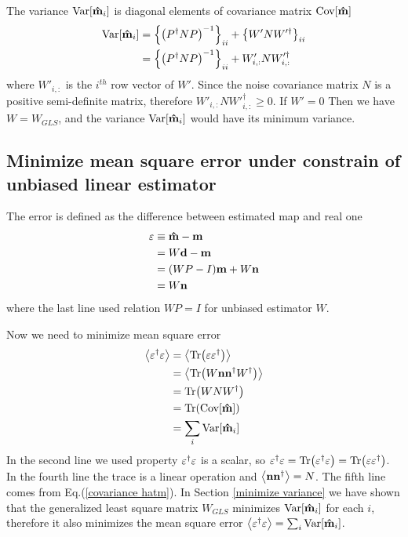 \documentclass[11pt, letterpaper]{article}
\newcommand{\Var}[1]{\text{Var}\qty[#1]}
\newcommand{\Cov}[1]{\text{Cov}\qty[#1]}
\newcommand{\vbd}{\vb{d}}
\newcommand{\vbm}{\vb{m}}
\newcommand{\vbep}{\vb{\varepsilon}}
\newcommand{\vbn}{\vb{n}}
\newcommand{\inv}[1]{#1^{-1}}
\newcommand{\hatm}{\vb{\hat{m}}}
\newcommand{\Pdagger}{P^{\dagger}}
\newcommand{\PPinv}[1]{\inv{\qty(\Pdagger #1 P)}}
\begin{document}
The variance $\Var{\hatm_i}$ is diagonal elements of covariance matrix
$\Cov{\hatm}$
\begin{align}
\begin{aligned}[b]
\Var{\hatm_i}
&= \qty\Big{ \PPinv{N}}_{ii} + \qty\big{W' N W'^{\dagger}}_{ii}
\\
&= \qty\Big{ \PPinv{N}}_{ii} + W'_{i,:} N W'^{\dagger}_{i,:}
\end{aligned}
\end{align}
where $W'_{i,:}$ is the $i^{th}$ row vector of $W'$.
Since the noise covariance matrix $N$ is a positive semi-definite matrix,
therefore $W'_{i,:} N W'^{\dagger}_{i,:} \geq 0$.
If $W' = 0$ Then we have $W = W_{GLS}$, and the variance $\Var{\hatm_i}$ would have 
its minimum variance. 

\subsection{Minimize mean square error under constrain of unbiased linear 
estimator}
The error is defined as the difference between estimated map and real one
\begin{align}
\begin{aligned}[b]
\vbep &\equiv \hatm - \vbm
\\
&= W\vbd - \vbm
\\
&= (WP-I)\vbm + W\vbn
\\
&= W\vbn
\end{aligned}
\end{align}
where the last line used relation $WP=I$ for unbiased estimator $W$. 

Now we need to minimize mean square error
\begin{align}
\begin{aligned}[b]
\ev{\vbep^{\dagger} \vbep }
&= \ev{\Tr(\vbep \vbep^{\dagger})}
\\
&=\ev{\Tr(W\vbn \vbn^{\dagger} W^{\dagger}) }
\\
&= \Tr(W N W^{\dagger})
\\
&= \Tr(\Cov{\hatm})\\
&= \sum_i \Var{\hatm_i}
\end{aligned}
\end{align}
In the second line we used property $\vbep^{\dagger} \vbep$ is a scalar,
so $\vbep^{\dagger} \vbep = \Tr(\vbep^{\dagger} \vbep) 
= \Tr(\vbep \vbep^{\dagger})$.
In the fourth line the trace is a linear operation 
and $\ev{\vbn \vbn^{\dagger} } = N$. 
The fifth line comes from Eq.(\ref{covariance hatm}).
In Section \ref{minimize variance} we have shown that the generalized least 
square matrix $W_{GLS}$ minimizes $\Var{\hatm_i}$ for each $i$, 
therefore it also minimizes the mean square error
$\ev{\vbep^{\dagger} \vbep} = \sum_i \Var{\hatm_i}$. 
\end{document}
